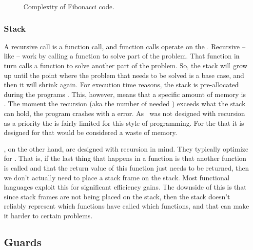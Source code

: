 \begin{figure}[tbp]
  
  \caption{Complexity of Fibonacci code.}
  \label{fig:fun:fib}
\end{figure}

\subsubsection{Stack}

A recursive call is a function call, and function calls operate on the . Recursive  -- like  -- work by calling a function to solve part of the problem. That function in turn calls a function to solve another part of the problem. So, the stack will grow up until the point where the problem that needs to be solved is a base case, and then it will shrink again. For execution time  reasons, the stack is pre-allocated during the programs . This, however, means that a specific amount of memory is . The moment the recursion  (aka the number of needed ) exceeds what the stack can hold, the program crashes with a  error. As \csharp\ was not designed with recursion as a priority the  is fairly limited for this style of programming. For the  that it is designed for that would be considered a waste of memory.

, on the other hand, are designed with recursion in mind. They typically optimize for . That is, if the last thing that happens in a function is that another function is called and that the return value of this function just needs to be returned, then we don't actually need to place a stack frame on the stack. Most functional languages exploit this for significant efficiency gains. The downside of this is that since stack frames are not being placed on the stack, then the stack doesn't reliably represent which functions have called which functions, and that can make it harder to  certain problems.

\subsection{Guards}

